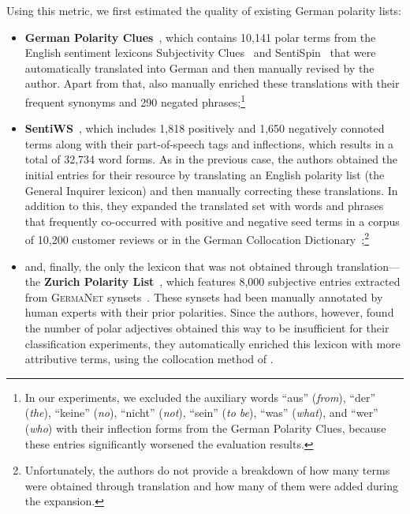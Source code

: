Using this metric, we first estimated the quality of existing German
polarity lists:
\begin{itemize}
\item\textbf{German Polarity Clues}~\cite[GPC;][]{Waltinger:10}, which
  contains 10,141 polar terms from the English sentiment lexicons
  Subjectivity Clues~\cite{Wilson:05} and SentiSpin~\cite{Takamura:05}
  that were automatically translated into German and then manually
  revised by the author.  Apart from that, \citeauthor{Waltinger:10}
  also manually enriched these translations with their frequent
  synonyms and 290 negated phrases;\footnote{In our experiments, we
    excluded the auxiliary words ``aus'' (\emph{from}), ``der''
    (\emph{the}), ``keine'' (\emph{no}), ``nicht'' (\emph{not}),
    ``sein'' (\emph{to be}), ``was'' (\emph{what}), and ``wer''
    (\emph{who}) with their inflection forms from the German Polarity
    Clues, because these entries significantly worsened the evaluation
    results.}

\item\textbf{SentiWS}~\cite[SWS;][]{Remus:10}, which includes 1,818
  positively and 1,650 negatively connoted terms along with their
  part-of-speech tags and inflections, which results in a total of
  32,734 word forms.  As in the previous case, the authors obtained
  the initial entries for their resource by translating an English
  polarity list (the General Inquirer lexicon) and then manually
  correcting these translations.  In addition to this, they expanded
  the translated set with words and phrases that frequently
  co-occurred with positive and negative seed terms in a corpus of
  10,200 customer reviews or in the German Collocation
  Dictionary~\cite{Quasthoff:10};\footnote{Unfortunately, the authors
    do not provide a breakdown of how many terms were obtained through
    translation and how many of them were added during the expansion.}

\item and, finally, the only the lexicon that was not obtained through
  translation---the \textbf{Zurich Polarity
    List}~\cite[ZPL;][]{Clematide:10}, which features 8,000 subjective
  entries extracted from \textsc{GermaNet} synsets~\cite{Hamp:97}.
  These synsets had been manually annotated by human experts with
  their prior polarities.  Since the authors, however, found the
  number of polar adjectives obtained this way to be insufficient for
  their classification experiments, they automatically enriched this
  lexicon with more attributive terms, using the collocation method of
  \citet{Hatzivassi:97}.
\end{itemize}

